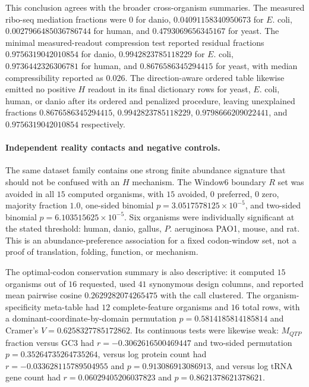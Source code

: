 This conclusion agrees with the broader cross-organism summaries.  The measured ribo-seq mediation fractions were $0$ for danio, $0.04091158340950673$ for $E.$ coli, $0.0027966485036786744$ for human, and $0.4793069656345167$ for yeast.  The minimal measured-readout compression test reported residual fractions $0.9756319042010854$ for danio, $0.9942823785118229$ for $E.$ coli, $0.9736442326306781$ for human, and $0.8676586345294415$ for yeast, with median compressibility reported as $0.026$.  The direction-aware ordered table likewise emitted no positive $H$ readout in its final dictionary rows for yeast, $E.$ coli, human, or danio after its ordered and penalized procedure, leaving unexplained fractions $0.8676586345294415$, $0.9942823785118229$, $0.9798666209022441$, and $0.9756319042010854$ respectively.

\paragraph{Independent reality contacts and negative controls.}
The same dataset family contains one strong finite abundance signature that should not be confused with an $H$ mechanism.  The Window6 boundary $R$ set was avoided in all $15$ computed organisms, with $15$ avoided, $0$ preferred, $0$ zero, majority fraction $1.0$, one-sided binomial $p=3.0517578125\times 10^{-5}$, and two-sided binomial $p=6.103515625\times 10^{-5}$.  Six organisms were individually significant at the stated threshold: human, danio, gallus, $P.$ aeruginosa PAO1, mouse, and rat.  This is an abundance-preference association for a fixed codon-window set, not a proof of translation, folding, function, or mechanism.

The optimal-codon conservation summary is also descriptive: it computed $15$ organisms out of $16$ requested, used $41$ synonymous design columns, and reported mean pairwise cosine $0.2629282074265475$ with the call clustered.  The organism-specificity meta-table had $12$ complete-feature organisms and $16$ total rows, with a dominant-coordinate-by-domain permutation $p=0.5814185814185814$ and Cramer's $V=0.6258327785172862$.  Its continuous tests were likewise weak: $M_{QTP}$ fraction versus GC3 had $r=-0.3062616500469447$ and two-sided permutation $p=0.35264735264735264$, versus log protein count had $r=-0.033628115789504955$ and $p=0.913086913086913$, and versus log tRNA gene count had $r=0.06029405206037823$ and $p=0.8621378621378621$.

